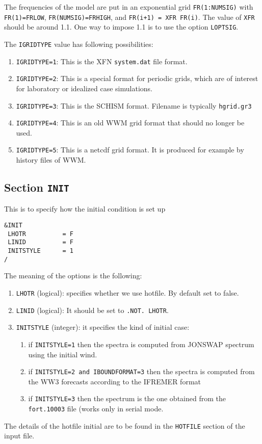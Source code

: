 \documentclass[12pt]{amsart}
\begin{document}
The frequencies of the model are put in an exponential grid {\tt FR(1:NUMSIG)} with {\tt FR(1)=FRLOW}, {\tt FR(NUMSIG)=FRHIGH}, and {\tt FR(i+1) = XFR FR(i)}. The value of {\tt XFR} should be around 1.1. One way to impose 1.1 is to use the option {\tt LOPTSIG}.

The {\tt IGRIDTYPE} value has following possibilities:
\begin{enumerate}
\item {\tt IGRIDTYPE=1}: This is the XFN {\tt system.dat} file format.
\item {\tt IGRIDTYPE=2}: This is a special format for periodic grids, which are of interest for laboratory or idealized case simulations.
\item {\tt IGRIDTYPE=3}: This is the SCHISM format. Filename is typically {\tt hgrid.gr3}
\item {\tt IGRIDTYPE=4}: This is an old WWM grid format that should no longer be used.
\item {\tt IGRIDTYPE=5}: This is a netcdf grid format. It is produced for example by history files of WWM.
\end{enumerate}


\newpage

\subsection{Section {\tt INIT}}
This is to specify how the initial condition is set up
\begin{verbatim}
&INIT
 LHOTR          = F   
 LINID          = F   
 INITSTYLE      = 1   
/
\end{verbatim}
The meaning of the options is the following:
\begin{enumerate}
\item {\tt LHOTR} (logical): specifies whether we use hotfile. By default set to false.
\item {\tt LINID} (logical): It should be set to {\tt .NOT. LHOTR}.
\item {\tt INITSTYLE} (integer): it specifies the kind of initial case:
  \begin{enumerate}
  \item if {\tt INITSTYLE=1} then the spectra is computed from JONSWAP spectrum using the initial wind.
  \item if {\tt INITSTYLE=2 and IBOUNDFORMAT=3} then the spectra is computed from the WW3 forecasts according to the IFREMER format
  \item if {\tt INITSTYLE=3} then the spectrum is the one obtained from the {\tt fort.10003} file (works only in serial mode.
  \end{enumerate}
\end{enumerate}
The details of the hotfile initial are to be found in the {\tt HOTFILE} section of the input file.
\end{document}

